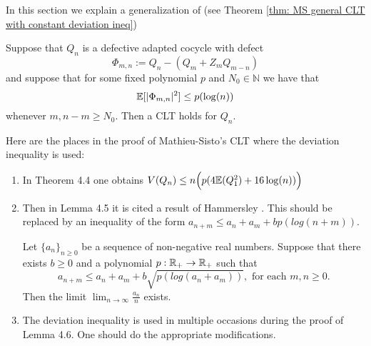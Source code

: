 
In this section we explain a generalization of \cite[Theorems 4.1 \& 4.2]{MathieuSisto2020} (see Theorem \ref{thm: MS general CLT with constant deviation ineq})

\begin{thm} \label{thm: polylogarithmic MS CLT}
    Suppose that $Q_n$ is a defective adapted cocycle with defect
    \[
       \Phi_{m,n} := Q_n - (Q_m + Z_m Q_{m-n})
    \]
    and suppose that for some fixed polynomial $p$ and $N_0 \in \mathbb{N}$ we have that
    \[
       \mathbb{E}[|\Phi_{m,n}|^2] \le p(\log (n))
    \]
    whenever $m, n-m \ge N_0$.
    Then a CLT holds for $Q_n$.
\end{thm}

Here are the places in the proof of Mathieu-Sisto's CLT where the deviation inequality is used:
\begin{enumerate}
    \item In Theorem 4.4 one obtains $V(Q_n)\le n\Big(p(4 \mathbb{E}(Q_1^2)+ 16\log(n))\Big)$
    \item Then in Lemma 4.5 it is cited a result of Hammersley \cite[Theorem 2]{Hammerslet1962}. This should be replaced by an inequality of the form $a_{n+m}\le a_n+a_m+bp(log(n+m))$.
    \begin{lem}
    	Let $\{a_n\}_{n\ge 0}$ be a sequence of non-negative real numbers. Suppose that there exists $b\ge 0$ and a polynomial $p:\mathbb{R}_{+}\to \mathbb{R}_{+}$ such that 
    	\[
    	a_{n+m}\le a_n+a_m+b\sqrt{p(log(a_n+a_m))}, \text{ for each }m,n\ge 0.
    	\]
    	Then the limit $\lim_{n\to \infty} \frac{a_n}{n}$ exists.
    \end{lem}
    \item The deviation inequality is used in multiple occasions during the proof of Lemma 4.6. One should do the appropriate modifications.
\end{enumerate}